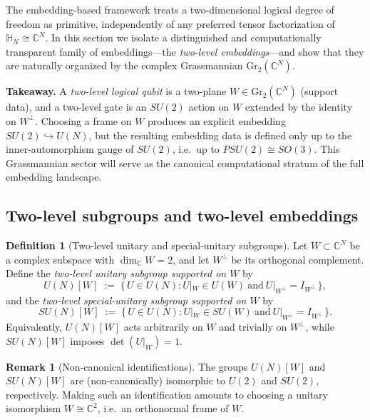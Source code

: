 \documentclass{article}%
\theoremstyle{definition}
\newtheorem{definition}[theorem]{Definition}
\newtheorem{remark}[theorem]{Remark}
\numberwithin{equation}{section}
\newcommand{\C}{\mathbb{C}}
\newcommand{\Gr}{\mathrm{Gr}}
\begin{document}
\noindent
The embedding-based framework treats a two-dimensional logical degree of freedom as primitive,
independently of any preferred tensor factorization of $\mathbb{H}_N\cong\C^N$. In this section we
isolate a distinguished and computationally transparent family of embeddings---the \emph{two-level
embeddings}---and show that they are naturally organized by the complex Grassmannian $\Gr_2(\C^N)$.

\smallskip
\noindent
\textbf{Takeaway.} A \emph{two-level logical qubit} is a two-plane $W\in\Gr_2(\C^N)$ (support data),
and a two-level gate is an $SU(2)$ action on $W$ extended by the identity on $W^\perp$. Choosing a
frame on $W$ produces an explicit embedding $SU(2)\hookrightarrow U(N)$, but the resulting embedding
data is defined only up to the inner-automorphism gauge of $SU(2)$, i.e.\ up to $PSU(2)\cong SO(3)$.
This Grassmannian sector will serve as the canonical computational stratum of the full embedding
landscape.

\subsection{Two-level subgroups and two-level embeddings}
\label{subsec:two_level_embeddings}

\begin{definition}[Two-level unitary and special-unitary subgroups]\label{def:two_level_subgroup}
Let $W\subset \C^N$ be a complex subspace with $\dim_\C W=2$, and let $W^\perp$ be its orthogonal
complement. Define the \emph{two-level unitary subgroup supported on $W$} by
\begin{equation}\label{eq:two_level_subgroup_UN}
U(N)[W]\;:=\;\{\,U\in U(N): U|_{W}\in U(W)\ \text{and}\ U|_{W^\perp}=I_{W^\perp}\,\},
\end{equation}
and the \emph{two-level special-unitary subgroup supported on $W$} by
\begin{equation}\label{eq:two_level_subgroup_SUN}
SU(N)[W]\;:=\;\{\,U\in U(N): U|_{W}\in SU(W)\ \text{and}\ U|_{W^\perp}=I_{W^\perp}\,\}.
\end{equation}
Equivalently, $U(N)[W]$ acts arbitrarily on $W$ and trivially on $W^\perp$, while $SU(N)[W]$ imposes
$\det(U|_W)=1$.
\end{definition}

\begin{remark}[Non-canonical identifications]
The groups $U(N)[W]$ and $SU(N)[W]$ are (non-canonically) isomorphic to $U(2)$ and $SU(2)$,
respectively. Making such an identification amounts to choosing a unitary isomorphism $W\cong\C^2$,
i.e.\ an orthonormal frame of $W$.
\end{remark}
\end{document}
